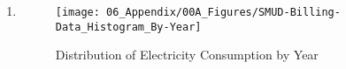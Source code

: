 \begin{enumerate}
    \item
    
    
    \begin{figure}[h!]
    \centering
    \texttt{[image: 06\_Appendix/00A\_Figures/SMUD-Billing-Data\_Histogram\_By-Year]}
    \caption{Distribution of Electricity Consumption by Year}
    \label{Figure:SMUD-Billing-Data_Histogram_By-Year}
\end{figure}


\end{enumerate}

